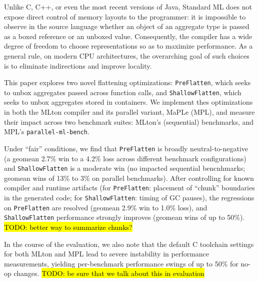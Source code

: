 
Unlike C, C++, or even the most recent versions of Java, Standard ML does not
expose direct control of memory layouts to the programmer: it is impossible to
observe in the source language whether an object of an aggregate type is passed
as a boxed reference or an unboxed value. Consequently, the compiler has a wide
degree of freedom to choose representations so as to maximize performance. As a
general rule, on modern CPU architectures, the overarching goal of such choices
is to eliminate indirections and improve locality.

This paper explores two novel flattening optimizations: \texttt{PreFlatten},
which seeks to unbox aggregates passed across function calls,
and \texttt{ShallowFlatten}, which seeks to unbox aggregates stored in
containers. We implement thes optimizations in both the MLton compiler and its
parallel variant, MaPLe (MPL), and measure their impact across two
benchmark suites: MLton's (sequential) benchmarks, and
MPL's \texttt{parallel-ml-bench}.

Under ``fair'' conditions, we find that \texttt{PreFlatten} is broadly
neutral-to-negative (a geomean 2.7\% win to a 4.2\% loss across different
benchmark configurations) and \texttt{ShallowFlatten} is a moderate win (no
impacted sequential bencnhmarks; geomean wins of 13\% to 3\% on parallel
benchmarks). After controlling for known compiler and runtime artifacts
(for \texttt{PreFlatten}: placement of ``chunk'' boundaries in the generated
code; for \texttt{ShallowFlatten}: timing of GC pauses), the regressions
on \texttt{PreFlatten} are resolved (geomean 2.9\% win to 1.0\% loss),
and \texttt{ShallowFlatten} performance strongly improves (geomean wins of up to
50\%). \hl{TODO: better way to summarize chunks?}

In the course of the evaluation, we also note that the default C toolchain
settings for both MLton and MPL lead to severe instability in performance
measurements, yielding per-benchmark performance swings of up to 50\% for no-op
changes. \hl{TODO: be sure that we talk about this in evaluation}


